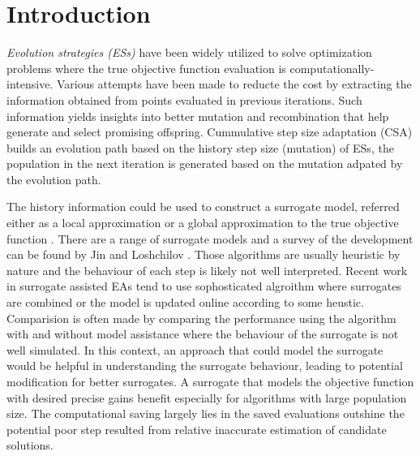 \section{Introduction}


\textit{Evolution strategies (ESs)} have been widely utilized to solve optimization problems where the true objective function evaluation is computationally-intensive. Various attempts have been made to reducte the cost by extracting the information obtained from points evaluated in previous iterations. Such information yields insights into better mutation and recombination that help generate and select promising offspring. Cummulative step size adaptation (CSA) \cite{Ostermeier:1994:DAS:1326675.1326679} builds an evolution path based on the history step size (mutation) of ESs, the population in the next iteration is generated based on the mutation adpated by the evolution path. 

The history information could be used to construct a surrogate model, referred either as a local approximation or a global approximation to the true objective function \cite{Jin:2002:FAE:2955491.2955686}. There are a range of surrogate models and a survey of the development can be found by Jin \cite{JIN201161} and Loshchilov \cite{ECJ2016_LMCMA}. Those algorithms are usually heuristic by nature and the behaviour of each step is likely not well interpreted. Recent work in surrogate assisted EAs tend to use sophosticated algroithm where surrogates are combined or the model is updated online according to some heustic. Comparision is often made by comparing the performance using the algorithm with and without model assistance where the behaviour of the surrogate is not well simulated. In this context, an approach that could model the surrogate would be helpful in understanding the surrogate behaviour, leading to potential modification for better surrogates. A surrogate that models the objective function with desired precise gains benefit especially for algorithms with large population size.
The computational saving largely lies in the saved evaluations outshine the potential poor step resulted from relative inaccurate estimation of candidate solutions. 


